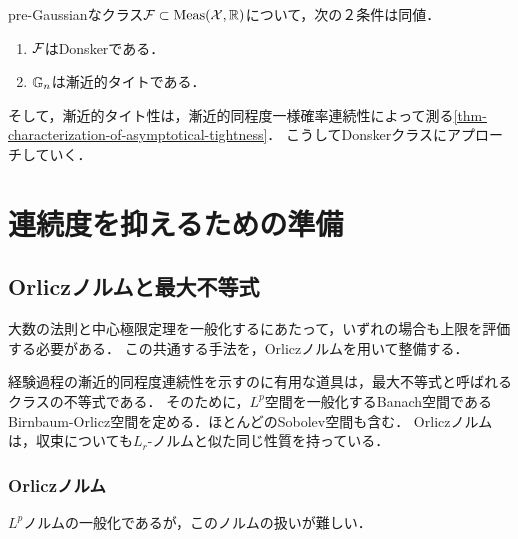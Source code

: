 \documentclass[uplatex,dvipdfmx]{jsreport}
\begin{document}
\begin{lemma}
    pre-Gaussianなクラス$\mathcal{F}\subset\mathrm{Meas}(\mathcal{X},\mathbb{R})$について，次の２条件は同値．
    \begin{enumerate}
        \item $\mathcal{F}$はDonskerである．
        \item $\mathbb{G}_n$は漸近的タイトである．
    \end{enumerate}
\end{lemma}
\begin{remarks}
    そして，漸近的タイト性は，漸近的同程度一様確率連続性によって測る\ref{thm-characterization-of-asymptotical-tightness}．
    こうしてDonskerクラスにアプローチしていく．
\end{remarks}


\section{連続度を抑えるための準備}



\subsection{Orliczノルムと最大不等式}

\begin{tcolorbox}[colframe=ForestGreen, colback=ForestGreen!10!white,breakable,colbacktitle=ForestGreen!40!white,coltitle=black,fonttitle=\bfseries\sffamily,
    title=道具１：]
        大数の法則と中心極限定理を一般化するにあたって，いずれの場合も上限を評価する必要がある．
        この共通する手法を，Orliczノルムを用いて整備する．
    \end{tcolorbox}

\begin{tcolorbox}[colframe=ForestGreen, colback=ForestGreen!10!white,breakable,colbacktitle=ForestGreen!40!white,coltitle=black,fonttitle=\bfseries\sffamily,
title=]
    経験過程の漸近的同程度連続性を示すのに有用な道具は，最大不等式と呼ばれるクラスの不等式である．
    そのために，$L^p$空間を一般化するBanach空間であるBirnbaum-Orlicz空間を定める．ほとんどのSobolev空間も含む．
    Orliczノルムは，収束についても$L_r$-ノルムと似た同じ性質を持っている．
\end{tcolorbox}

\subsubsection{Orliczノルム}

\begin{tcolorbox}[colframe=ForestGreen, colback=ForestGreen!10!white,breakable,colbacktitle=ForestGreen!40!white,coltitle=black,fonttitle=\bfseries\sffamily,
title=]
    $L^p$ノルムの一般化であるが，このノルムの扱いが難しい．
\end{tcolorbox}
\end{document}
